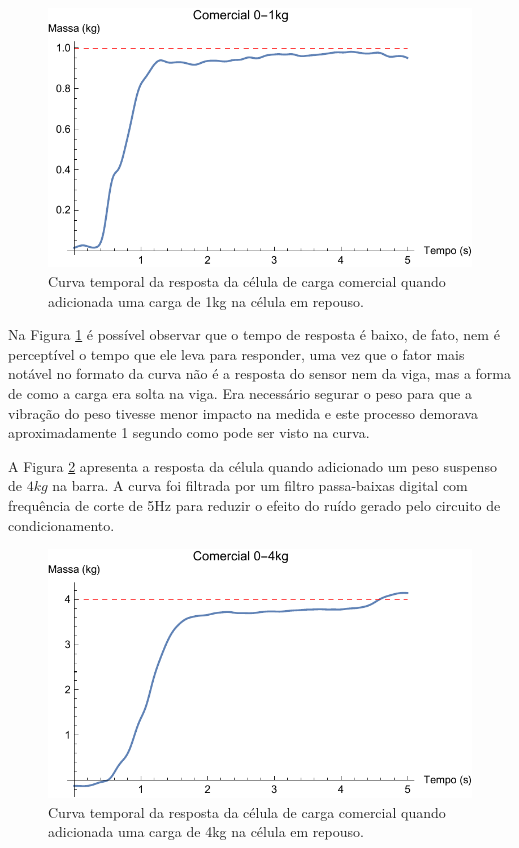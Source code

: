 \documentclass[a4paper]{instrumentacao}
\begin{document}
\begin{figure}[H]
\center
\includegraphics[width=\textwidth]{Comercial_0-1kg.pdf}
\caption{Curva temporal da resposta da célula de carga comercial quando adicionada uma carga de 1kg na célula em repouso.}
\label{fig:celula-comercial-resultado-0-1kg}
\end{figure}

Na Figura \ref{fig:celula-comercial-resultado-0-1kg} é possível observar que o tempo de resposta é baixo, de fato, nem é perceptível o tempo que ele leva para responder, uma vez que o fator mais notável no formato da curva não é a resposta do sensor nem da viga, mas a forma de como a carga era solta na viga. Era necessário segurar o peso para que a vibração do peso tivesse menor impacto na medida e este processo demorava aproximadamente 1 segundo como pode ser visto na curva.

A Figura \ref{fig:celula-comercial-resultado-0-4kg} apresenta a resposta da célula quando adicionado um peso suspenso de $4 kg$ na barra. A curva foi filtrada por um filtro passa-baixas digital com frequência de corte de 5Hz para reduzir o efeito do ruído gerado pelo circuito de condicionamento.

\begin{figure}[H]
\center
\includegraphics[width=\textwidth]{Comercial_0-4kg.pdf}
\caption{Curva temporal da resposta da célula de carga comercial quando adicionada uma carga de 4kg na célula em repouso.}
\label{fig:celula-comercial-resultado-0-4kg}
\end{figure}
\end{document}

